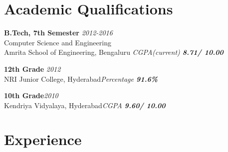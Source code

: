 \documentclass[margin]{res}
\begin{document}
 

\address{\Large {\bf{Sricharan Chiruvolu}}\\[10pt]{\sl (+91) 9035 886166 } \\ {\sl \underline{sricharanized@gmail.com}}
        }
\address{Mathura block \\ Amrita School of Engineering  \\
         Kasavanahalli, Carmelaram P.O.\\ Bengaluru, India - 560035}
 
\begin{resume}

	

\section{Academic Qualifications}
{\bf B.Tech, 7th Semester} {\sl \hfill 2012-2016}
 \\Computer Science and Engineering\\ Amrita School of Engineering, Bengaluru {\sl \hfill CGPA(current) {\bf 8.71/ 10.00}}

{\bf 12th Grade} {\sl \hfill 2012}
\\NRI Junior College, Hyderabad{\sl \hfill Percentage {\bf 91.6\% }}

{\bf 10th Grade}{\sl \hfill 2010}
 \\ Kendriya Vidyalaya, Hyderabad{\sl \hfill CGPA {\bf 9.60/ 10.00}}


\section{Experience}
	

\end{resume}
\end{document}
